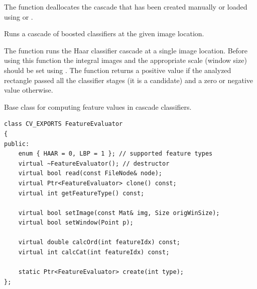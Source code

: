 \begin{description}
\end{description}

The function deallocates the cascade that has been created manually or loaded using  or .

Runs a cascade of boosted classifiers at the given image location.


\begin{description}
\end{description}

The function runs the Haar classifier
cascade at a single image location. Before using this function the
integral images and the appropriate scale (window size) should be set
using . The function returns
a positive value if the analyzed rectangle passed all the classifier stages
(it is a candidate) and a zero or negative value otherwise.

\fi

\fi

\ifCpp

Base class for computing feature values in cascade classifiers.

\begin{lstlisting}
class CV_EXPORTS FeatureEvaluator
{
public:    
    enum { HAAR = 0, LBP = 1 }; // supported feature types 
    virtual ~FeatureEvaluator(); // destructor
    virtual bool read(const FileNode& node);
    virtual Ptr<FeatureEvaluator> clone() const;
    virtual int getFeatureType() const;
    
    virtual bool setImage(const Mat& img, Size origWinSize);
    virtual bool setWindow(Point p);

    virtual double calcOrd(int featureIdx) const;
    virtual int calcCat(int featureIdx) const;

    static Ptr<FeatureEvaluator> create(int type);
};
\end{lstlisting}

